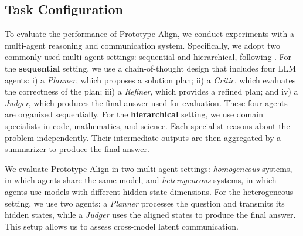 \documentclass[11pt]{article}
\begin{document}
\subsection{Task Configuration}
\label{app:config_task}
To evaluate the performance of Prototype Align, we conduct experiments with a multi-agent reasoning and communication system. Specifically, we adopt two commonly used multi-agent settings: sequential and hierarchical, following \citet{latentmas}. For the \textbf{sequential} setting, we use a chain-of-thought design that includes four LLM agents: i) a \emph{Planner}, which proposes a solution plan; ii) a \emph{Critic}, which evaluates the correctness of the plan; iii) a \emph{Refiner}, which provides a refined plan; and iv) a \emph{Judger}, which produces the final answer used for evaluation. These four agents are organized sequentially. For the \textbf{hierarchical} setting, we use domain specialists in code, mathematics, and science. Each specialist reasons about the problem independently. Their intermediate outputs are then aggregated by a summarizer to produce the final answer.

We evaluate Prototype Align in two multi-agent settings: \textit{homogeneous} systems, in which agents share the same model, and \textit{heterogeneous} systems, in which agents use models with different hidden-state dimensions. For the heterogeneous setting, we use two agents: a \emph{Planner} processes the question and transmits its hidden states, while a \emph{Judger} uses the aligned states to produce the final answer. This setup allows us to assess cross-model latent communication.
\end{document}
